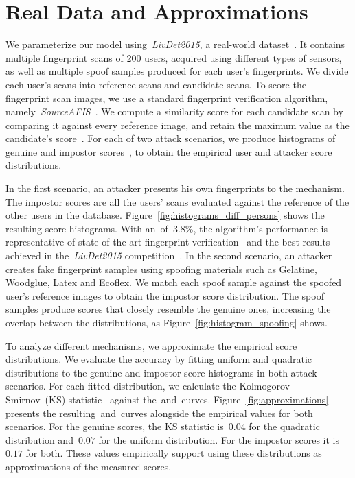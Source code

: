\documentclass[conference,compsoc]{IEEEtran}
\begin{document}
\section{Real Data and Approximations}
\label{sec:real_data}
\noindent
We parameterize our model using~\textit{LivDet2015}, a real-world dataset~\cite{LivDet2015,LivDet2013,LivDet2011,LivDet2009}.
It contains multiple fingerprint scans of 200 users, acquired using different types of sensors, as well as multiple spoof samples produced for each user's fingerprints.
We divide each user's scans into reference scans and candidate scans. 
To score the fingerprint scan images, we use a standard fingerprint verification algorithm, namely~\textit{SourceAFIS}~\cite{sourceafis}. 
We compute a similarity score for each candidate scan by comparing it against every reference image, and retain the maximum value as the candidate's score~\cite{hong1998,Cappelli2006,max_score2009}.
For each of two attack scenarios, we produce histograms of genuine and impostor scores~\cite{Anil1997,Cappelli2006,Slob2005}, to obtain the empirical user and attacker score distributions.

In the first scenario, an attacker presents his own fingerprints to the mechanism. 
The impostor scores are all the users' scans evaluated against the reference of the other users in the database.
Figure~\ref{fig:histograms_diff_persons} shows the resulting score histograms.
With an~\EER of~3.8\%, the algorithm’s performance is representative of state-of-the-art fingerprint verification~\cite{Maio2002,Cappelli2006} and the best results achieved in the~\textit{LivDet2015} competition~\cite{LivDet2015}.
In the second scenario, an attacker creates fake fingerprint samples using spoofing materials such as Gelatine, Woodglue, Latex and Ecoflex. We match each spoof sample against the spoofed user's reference images to obtain the impostor score distribution. The spoof samples produce scores that closely resemble the genuine ones, increasing the overlap between the distributions, as Figure~\ref{fig:histogram_spoofing} shows.

To analyze different mechanisms, we approximate the empirical score distributions. 
We evaluate the accuracy by fitting uniform and quadratic distributions to the genuine and impostor score histograms in both attack scenarios.
For each fitted distribution, we calculate the Kolmogorov-Smirnov~(KS) statistic~\cite{Massey1951} against the~\FRR and~\FAR curves.
Figure~\ref{fig:approximations} presents the resulting~\FAR and~\FRR curves alongside the empirical values for both scenarios.
For the genuine scores, the KS statistic is~$0.04$ for the quadratic distribution and~$0.07$ for the uniform distribution. For the impostor scores it is~$0.17$ for both. These values empirically support using these distributions as approximations of the measured scores.
\end{document}
